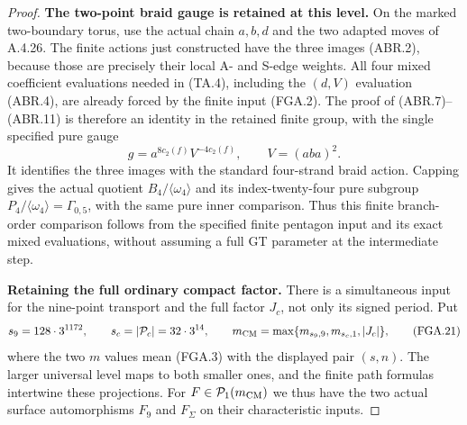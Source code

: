 \begin{proof}
\par\medskip\noindent\textbf{The two-point braid gauge is retained at this level.}\quad
On the marked two-boundary torus, use the actual
chain $a,b,d$ and the two adapted moves of A.4.26.
The finite actions just constructed have the three
images (ABR.2), because those are precisely their
local A- and S-edge weights.  All four mixed
coefficient evaluations needed in (TA.4), including
the $(d,V)$ evaluation (ABR.4), are already forced
by the finite input (FGA.2).
The proof of (ABR.7)--(ABR.11) is therefore an
identity in the retained finite group, with the
single specified pure gauge
\[
                   g=a^{8c_2(f)}V^{-4c_2(f)},
                   \qquad V=(aba)^2.
                                                               \tag{FGA.20}
\]
It identifies the three images with the standard
four-strand braid action.  Capping gives the
actual quotient $B_4/\langle\omega_4\rangle$
and its index-twenty-four pure subgroup
$P_4/\langle\omega_4\rangle=\Gamma_{0,5}$,
with the same pure inner comparison.  Thus this
finite branch-order comparison follows from the
specified finite pentagon input and its exact
mixed evaluations, without assuming a full GT
parameter at the intermediate step.

\par\medskip\noindent\textbf{Retaining the full ordinary compact factor.}\quad
There is a simultaneous input for the nine-point
transport and the full factor $J_c$, not only its
signed period.  Put
\[
 s_9=128\cdot3^{1172},\qquad s_c=|\mathcal P_c|=32\cdot3^{14},
 \qquad
 m_{\rm CM}=\max\{m_{s_9,9},m_{s_c,1},|J_c|\},
                                                               \tag{FGA.21}
\]
where the two $m$ values mean (FGA.3) with the
displayed pair $(s,n)$.
The larger universal level maps to both smaller
ones, and the finite path formulas intertwine
these projections.  For $F\in\mathcal P_1(m_{\rm CM})$
we thus have the two actual surface automorphisms
$F_9$ and $F_\Sigma$ on their characteristic inputs.


\end{proof}
